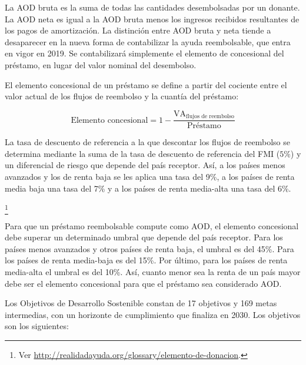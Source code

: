 \documentclass{nuevotema}
\begin{document}
\conceptos


La AOD bruta es la suma de todas las cantidades desembolsadas por un donante. La AOD neta es igual a la AOD bruta menos los ingresos recibidos resultantes de los pagos de amortización. La distinción entre AOD bruta y neta tiende a desaparecer en la nueva forma de contabilizar la ayuda reembolsable, que entra en vigor en 2019. Se contabilizará simplemente el elemento de concesional del préstamo, en lugar del valor nominal del desembolso.



El elemento concesional de un préstamo se define a partir del cociente entre el valor actual de los flujos de reembolso y la cuantía del préstamo:

\begin{equation}
\text{Elemento concesional} = 1 - \frac{\text{VA}_\text{flujos de reembolso}}{\text{Préstamo}}
\end{equation}

La tasa de descuento de referencia a la que descontar los flujos de reembolso se determina mediante la suma de la tasa de descuento de referencia del FMI ($5\%$) y un diferencial de riesgo que depende del país receptor. Así, a los países menos avanzados y los de renta baja se les aplica una tasa del 9\%, a los países de renta media baja una tasa del 7\% y a los países de renta media-alta una tasa del 6\%. 

\footnote{Ver \url{http://realidadayuda.org/glossary/elemento-de-donacion}.}

Para que un préstamo reembolsable compute como AOD, el elemento concesional debe superar un determinado umbral que depende del país receptor. Para los países menos avanzados y otros países de renta baja, el umbral es del 45\%. Para los países de renta media-baja es del 15\%. Por último, para los países de renta media-alta el umbral es del 10\%. Así, cuanto menor sea la renta de un país mayor debe ser el elemento concesional para que el préstamo sea considerado AOD. 


Los Objetivos de Desarrollo Sostenible constan de 17 objetivos y 169 metas intermedias, con un horizonte de cumplimiento que finaliza en 2030. Los objetivos son los siguientes:
\end{document}
